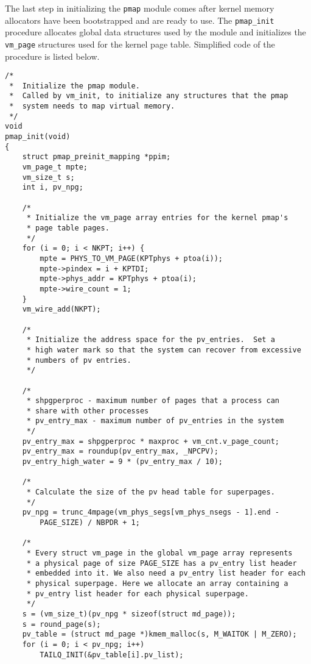 \documentclass[shortabstract, english]{iithesis}
\newenvironment{code}{}{}
\begin{document}
The last step in initializing the \texttt{pmap} module comes after kernel memory
allocators have been bootstrapped and are ready to use. The
\texttt{pmap_init} procedure allocates global data structures used by the
module and initializes the \texttt{vm_page} structures used for the
kernel page table. Simplified code of the procedure is listed below.

\begin{code}
\begin{verbatim}
/*
 *  Initialize the pmap module.
 *  Called by vm_init, to initialize any structures that the pmap
 *  system needs to map virtual memory.
 */
void
pmap_init(void)
{
    struct pmap_preinit_mapping *ppim;
    vm_page_t mpte;
    vm_size_t s;
    int i, pv_npg;

    /*
     * Initialize the vm_page array entries for the kernel pmap's
     * page table pages.
     */
    for (i = 0; i < NKPT; i++) {
        mpte = PHYS_TO_VM_PAGE(KPTphys + ptoa(i));
        mpte->pindex = i + KPTDI;
        mpte->phys_addr = KPTphys + ptoa(i);
        mpte->wire_count = 1;
    }
    vm_wire_add(NKPT);

    /*
     * Initialize the address space for the pv_entries.  Set a
     * high water mark so that the system can recover from excessive
     * numbers of pv entries.
     */

    /*
     * shpgperproc - maximum number of pages that a process can
     * share with other processes
     * pv_entry_max - maximum number of pv_entries in the system
     */
    pv_entry_max = shpgperproc * maxproc + vm_cnt.v_page_count;
    pv_entry_max = roundup(pv_entry_max, _NPCPV);
    pv_entry_high_water = 9 * (pv_entry_max / 10);

    /*
     * Calculate the size of the pv head table for superpages.
     */
    pv_npg = trunc_4mpage(vm_phys_segs[vm_phys_nsegs - 1].end -
        PAGE_SIZE) / NBPDR + 1;

    /*
     * Every struct vm_page in the global vm_page array represents
     * a physical page of size PAGE_SIZE has a pv_entry list header
     * embedded into it. We also need a pv_entry list header for each
     * physical superpage. Here we allocate an array containing a
     * pv_entry list header for each physical superpage.
     */
    s = (vm_size_t)(pv_npg * sizeof(struct md_page));
    s = round_page(s);
    pv_table = (struct md_page *)kmem_malloc(s, M_WAITOK | M_ZERO);
    for (i = 0; i < pv_npg; i++)
        TAILQ_INIT(&pv_table[i].pv_list);


\end{verbatim}
\end{code}
\end{document}

